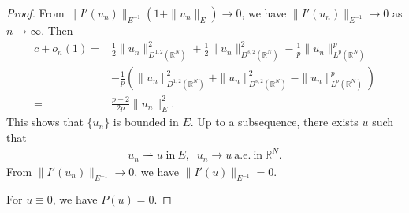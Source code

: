\documentclass[12pt,a4paper,reqno]{amsart}
\numberwithin{equation}{section}
\begin{document}
\begin{proof}
From $\|I'(u_{n})\|_{E^{-1}}(1+\|u_{n}\|_{E})\to 0$, we have
$\|I'(u_{n})\|_{E^{-1}}\to 0$ as $n\to\infty$.
Then
\begin{equation*}
\begin{aligned}
c+o_{n}(1)=&
\frac{1}{2}\|u_{n}\|_{D^{1,2}(\mathbb{R}^{N})}^{2}
+\frac{1}{2}\|u_{n}\|_{D^{s,2}(\mathbb{R}^{N})}^{2}
-\frac{1}{p}\|u_{n}\|_{L^{p}(\mathbb{R}^{N})}^{p}\\
&-\frac{1}{p}
\left(\|u_{n}\|_{D^{1,2}(\mathbb{R}^{N})}^{2}
+\|u_{n}\|_{D^{s,2}(\mathbb{R}^{N})}^{2}
-\|u_{n}\|_{L^{p}(\mathbb{R}^{N})}^{p}\right)\\
=&
\frac{p-2}{2p}\|u_{n}\|_{E}^{2}.
\end{aligned}
\end{equation*}
This shows that $\{u_{n}\}$ is bounded in $E$.
Up to a subsequence,
there exists
$u$
such that
\begin{equation*}
\begin{aligned}
u_{n}\rightharpoonup u
\;
\mathrm{in}
~
E,
\;\;
u_{n}\rightarrow u
~
\mathrm{a.e. ~in}
~
\mathbb{R}^{N}.
\end{aligned}
\end{equation*}
From $\|I'(u_{n})\|_{E^{-1}}\to 0$, we have
$\|I'(u)\|_{E^{-1}}=0$.



For
$u\equiv0$,
we have
$P(u)=0$.


\end{proof}
\end{document}
